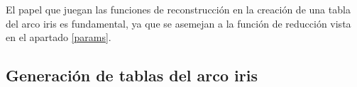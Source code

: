 \documentclass[12pt,spanish,listoffigures,listoftables,listofalgorithms]{tfgetsinf}
\newcommand{\hash}{\textit{hash}}
\begin{document}
El papel que juegan las funciones de reconstrucción en la creación de una tabla del arco iris es fundamental, ya que se asemejan a la función de reducción vista en el apartado \ref{params}.

\subsection{Generación de tablas del arco iris}

\end{document}
